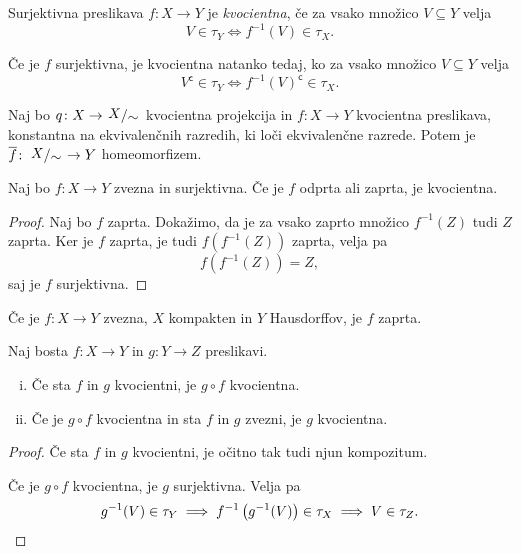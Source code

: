 \begin{definicija}
Surjektivna preslikava $f \colon X \to Y$ je
\emph{kvocientna}, če za vsako
množico $V \subseteq Y$ velja
\[
V \in \tau_Y \iff f^{-1}(V) \in \tau_X.
\]
\end{definicija}

\begin{opomba}
Če je $f$ surjektivna, je kvocientna natanko tedaj, ko za vsako
množico $V \subseteq Y$ velja
\[
V^{\mathsf{c}} \in \tau_Y \iff f^{-1}(V)^{\mathsf{c}} \in \tau_X.
\]
\end{opomba}

\begin{izrek}
Naj bo $q \colon X \to \kvoc{X}{\sim}$ kvocientna projekcija in
$f \colon X \to Y$ kvocientna preslikava, konstantna na
ekvivalenčnih razredih, ki loči ekvivalenčne razrede. Potem je
$\overline{f} \colon \kvoc{X}{\sim} \to Y$ homeomorfizem.
\end{izrek}

\obvs

\begin{lema}
Naj bo $f \colon X \to Y$ zvezna in surjektivna. Če je $f$ odprta
ali zaprta, je kvocientna.
\end{lema}

\begin{proof}
Naj bo $f$ zaprta. Dokažimo, da je za vsako zaprto množico
$f^{-1}(Z)$ tudi $Z$ zaprta. Ker je $f$ zaprta, je tudi
$f\left(f^{-1}(Z)\right) $ zaprta, velja pa
\[
f\left(f^{-1}(Z)\right) = Z,
\]
saj je $f$ surjektivna.
\end{proof}

\begin{opomba}
Če je $f \colon X \to Y$ zvezna, $X$ kompakten in $Y$ Hausdorffov,
je $f$ zaprta.
\end{opomba}

\begin{trditev}
Naj bosta $f \colon X \to Y$ in $g \colon Y \to Z$ preslikavi.

\begin{enumerate}[i)]
\item Če sta $f$ in $g$ kvocientni, je $g \circ f$ kvocientna.
\item Če je $g \circ f$ kvocientna in sta $f$ in $g$ zvezni, je $g$
kvocientna.
\end{enumerate}
\end{trditev}

\begin{proof}
Če sta $f$ in $g$ kvocientni, je očitno tak tudi njun kompozitum.

Če je $g \circ f$ kvocientna, je $g$ surjektivna. Velja pa
\[
g^{-1}(V) \in \tau_Y \implies
f^{-1}\left(g^{-1}(V)\right) \in \tau_X \implies
V \in \tau_Z. \qedhere
\]
\end{proof}

